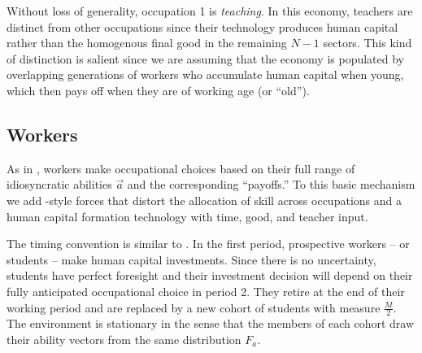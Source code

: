 \documentclass[onehalfspacing,11pt]{article}
\begin{document}
Without loss of generality, occupation 1 is \textit{teaching}. In this economy, teachers are distinct from other occupations since their technology produces human capital rather than the homogenous final good in the remaining $N-1$ sectors. This kind of distinction is salient since we are assuming that the economy is populated by overlapping generations of workers who accumulate human capital when young, which then pays off when they are of working age (or ``old'').
\subsection{Workers}
As in \cite{Roy:1951}, workers make occupational choices based on their full range of idiosyncratic abilities $\vec{a}$ and the corresponding ``payoffs.'' To this basic mechanism we add \cite{Hsieh:2018}-style forces that distort the allocation of skill across occupations and a human capital formation technology with time, good, and teacher input.

The timing convention is similar to \cite{Hsieh:2018}. In the first period, prospective workers -- or students -- make human capital investments. Since there is no uncertainty, students have perfect foresight and their investment decision will depend on their fully anticipated occupational choice in period 2. They retire at the end of their working period and are replaced by a new cohort of students with measure $\tfrac{M}{2}$. The environment is stationary in the sense that the members of each cohort draw their ability vectors from the same distribution $F_a$.
\end{document}
